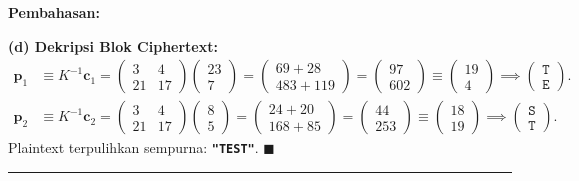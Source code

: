 \documentclass[11pt,a4paper]{article}
\newenvironment{solusi}{\noindent\textbf{\textsf{Pembahasan:}}\par\vspace{0.2em}}{\hfill$\blacksquare$\vspace{1em}\par\hrule\vspace{1em}}
\begin{document}
\begin{solusi}
\vspace{0.2cm}
\textbf{(d) Dekripsi Blok Ciphertext:}
\begin{align*}
\mathbf{p}_1 &\equiv K^{-1} \mathbf{c}_1 = \begin{pmatrix} 3 & 4 \\ 21 & 17 \end{pmatrix} \begin{pmatrix} 23 \\ 7 \end{pmatrix} = \begin{pmatrix} 69 + 28 \\ 483 + 119 \end{pmatrix} = \begin{pmatrix} 97 \\ 602 \end{pmatrix} \equiv \begin{pmatrix} 19 \\ 4 \end{pmatrix} \implies \begin{pmatrix} \texttt{T} \\ \texttt{E} \end{pmatrix}. \\
\mathbf{p}_2 &\equiv K^{-1} \mathbf{c}_2 = \begin{pmatrix} 3 & 4 \\ 21 & 17 \end{pmatrix} \begin{pmatrix} 8 \\ 5 \end{pmatrix} = \begin{pmatrix} 24 + 20 \\ 168 + 85 \end{pmatrix} = \begin{pmatrix} 44 \\ 253 \end{pmatrix} \equiv \begin{pmatrix} 18 \\ 19 \end{pmatrix} \implies \begin{pmatrix} \texttt{S} \\ \texttt{T} \end{pmatrix}.
\end{align*}
Plaintext terpulihkan sempurna: \textbf{\texttt{"TEST"}}.
\end{solusi}

\end{document}
